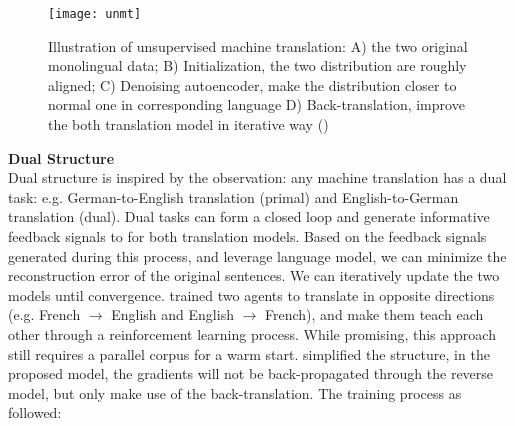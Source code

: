 \begin{figure}[h]
	\texttt{[image: unmt]}
	\caption{Illustration of unsupervised machine translation: A) the two original monolingual data; B) Initialization, the two distribution are roughly aligned; C) Denoising autoencoder, make the distribution closer to normal one in corresponding language D) Back-translation, improve the both translation model in iterative way (\cite{lample2018phrase})}

\end{figure}





\textbf{Dual Structure}\\
Dual structure is inspired by the observation: any machine translation has a dual task: e.g. German-to-English translation (primal) and English-to-German translation (dual). Dual tasks can form a closed loop and generate informative  feedback signals to for both translation models. Based on the feedback signals generated during this process, and leverage language model, we can minimize the reconstruction error of the original sentences. We can iteratively update the two models until convergence.   \cite{he2016dual} trained two agents to translate in opposite directions (e.g. French $\rightarrow$ English and English $\rightarrow$ French), and make them teach each other through a reinforcement learning process. While promising, this approach still requires a parallel corpus for a warm start. \cite{lample2018phrase} simplified the structure, in the proposed model, the gradients will not be back-propagated through the reverse model, but only make use of the back-translation. The training process as followed:

